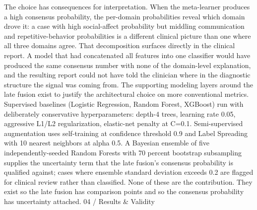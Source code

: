 \documentclass{obelus-preprint}
\begin{document}
The choice has consequences for interpretation. When the meta-learner produces a high consensus probability, the per-domain probabilities reveal which domain drove it: a case with high social-affect probability but middling communication and repetitive-behavior probabilities is a different clinical picture than one where all three domains agree. That decomposition surfaces directly in the clinical report. A model that had concatenated all features into one classifier would have produced the same consensus number with none of the domain-level explanation, and the resulting report could not have told the clinician where in the diagnostic structure the signal was coming from.
The supporting modeling layers around the late fusion exist to justify the architectural choice on more conventional metrics. Supervised baselines (Logistic Regression, Random Forest, XGBoost) run with deliberately conservative hyperparameters: depth-4 trees, learning rate 0.05, aggressive L1/L2 regularization, elastic-net penalty at C=0.1. Semi-supervised augmentation uses self-training at confidence threshold 0.9 and Label Spreading with 10 nearest neighbors at alpha 0.5. A Bayesian ensemble of five independently-seeded Random Forests with 70 percent bootstrap subsampling supplies the uncertainty term that the late fusion's consensus probability is qualified against; cases where ensemble standard deviation exceeds 0.2 are flagged for clinical review rather than classified. None of these are the contribution. They exist so the late fusion has comparison points and so the consensus probability has uncertainty attached.
04 / Results \& Validity
\end{document}
